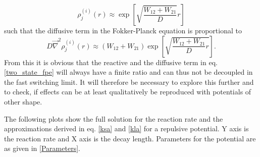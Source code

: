 \begin{equation}
    \rho^{(i)}_{j}(r) \approx \exp\left[\sqrt{\frac{W_{12}+W_{21}}{D}}r\right]
    \label{rate_dependence_of_ind_sol}
\end{equation}
such that the diffusive term in the Fokker-Planck equation is proportional to
\begin{equation}
D\vec{\nabla}^{2}\rho^{(i)}_{j}(r) \approx (W_{12}+W_{21})\exp\left[\sqrt{\frac{W_{12}+W_{21}}{D}r}\right].
    \label{rate_dependence_of_dif_term}
\end{equation}
From this it is obvious that the reactive and the diffusive term in eq. \eqref{two_state_fpe} will always have a finite ratio and can thus not be decoupled in the fast switching limit.
It will therefore be necessary to explore this further and to check, if effects can be at least qualitatively be reproduced with potentials of other shape. \par
The following plots show the full solution for the reaction rate and the approximations derived in eq. \eqref{ksa} and \eqref{kla} for a repulsive potential. Y axis is the reaction rate and X axis is the decay length. Parameters for the potential are as given in \eqref{Parameters}. \par
